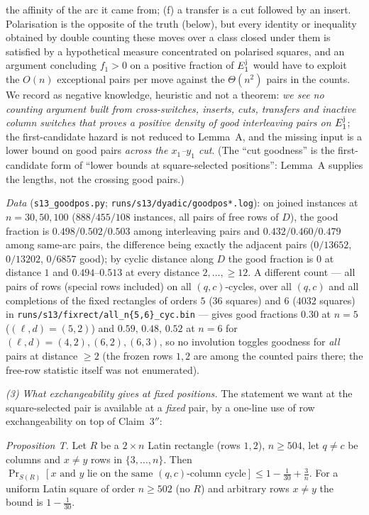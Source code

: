 the affinity of the arc it came from; (f) a transfer is a cut
followed by an insert.  Polarisation is the opposite of the truth
(below), but every identity or inequality obtained by double counting
these moves over a class closed under them is satisfied by a
hypothetical measure concentrated on polarised squares, and an
argument concluding $f_1>0$ on a positive fraction of $E_1^{\rm j}$
would have to exploit the $O(n)$ exceptional pairs per move against
the $\Theta(n^2)$ pairs in the counts.  We record as negative
knowledge, heuristic and not a theorem: \emph{we see no counting
argument built from cross-switches, inserts, cuts, transfers and
inactive column switches that proves a positive density of good
interleaving pairs on $E_1^{\rm j}$}; the first-candidate hazard is
not reduced to Lemma~A, and the missing input is a lower bound on good
pairs \emph{across the $x_1$--$y_1$ cut}.  (The ``cut goodness'' is
the first-candidate form of ``lower bounds at square-selected
positions'': Lemma~A supplies the lengths, not the crossing good
pairs.)

\emph{Data} (\texttt{s13\_goodpos.py}; \texttt{runs/s13/dyadic/goodpos*.log}):
on joined instances at $n=30,50,100$ ($888/455/108$ instances, all
pairs of free rows of $D$), the good fraction is $0.498/0.502/0.503$
among interleaving pairs and $0.432/0.460/0.479$ among same-arc pairs,
the difference being exactly the adjacent pairs ($0/13652$, $0/13202$,
$0/6857$ good); by cyclic distance along $D$ the good fraction is
$0$ at distance $1$ and $0.494$--$0.513$ at every distance $2,\dots,\ge12$.
A different count --- all pairs of rows (special rows included) on
all $(q,c)$-cycles, over all $(q,c)$ and all completions of the fixed
rectangles of orders $5$ ($36$ squares) and $6$ ($4032$ squares) in
\texttt{runs/s13/fixrect/all\_n\{5,6\}\_cyc.bin} --- gives good
fractions $0.30$ at $n=5$ ($(\ell,d)=(5,2)$) and $0.59,\,0.48,\,0.52$
at $n=6$ for $(\ell,d)=(4,2),(6,2),(6,3)$, so no involution toggles goodness for \emph{all} pairs at distance
$\ge2$ (the frozen rows $1,2$ are among the counted pairs there; the
free-row statistic itself was not enumerated).

\emph{(3) What exchangeability gives at fixed positions.}  The
statement we want at the square-selected pair is available at a
\emph{fixed} pair, by a one-line use of row exchangeability on top of
Claim~$3''$:

\emph{Proposition T.}  Let $R$ be a $2\times n$ Latin rectangle (rows
$1,2$), $n\ge504$, let $q\ne c$ be columns and $x\ne y$ rows in
$\{3,\dots,n\}$.  Then
$\Pr_{S(R)}[x\text{ and }y\text{ lie on the same }(q,c)\text{-column cycle}]\le1-\tfrac1{30}+\tfrac3n$.
For a uniform Latin square of order $n\ge502$ (no $R$) and arbitrary
rows $x\ne y$ the bound is $1-\tfrac1{30}$.

